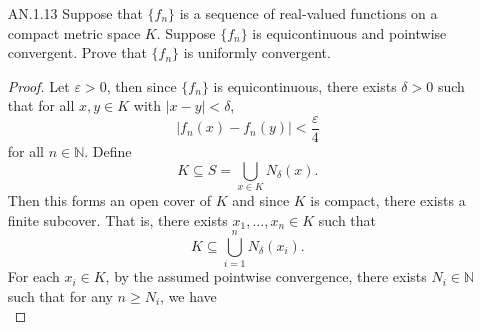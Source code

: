 \documentclass[12pt]{article}
\newenvironment{solution}
{\renewcommand\qedsymbol{$\blacksquare$}\begin{proof}[Solution]}
{\end{proof}}
\begin{document}
\begin{enumerate}
\begin{enumerate}[(a)]
\begin{solution}
                        order 7 in
                        $\mathbb{Z}_{49}\times\mathbb{Z}_{11}$.\par\hspace{4mm}
                        For
                        $\mathbb{Z}_7\times\mathbb{Z}_7\times\mathbb{Z}_{11}$,
                        we are looking for elements $(a, b, c)$ such that 
                        \begin{equation*}
                            lcm(o(a), o(b), o(c))=7.
                        \end{equation*}
                        Since $\mathbb{Z}_7\times\mathbb{Z}_7$ is a group of
                        order 49 and no element can have order 49, then there
                        are $49-1=48$ many elements order 7. 
                    \end{solution}
            \end{enumerate}
        \item[AN.1.13] Suppose that $\{f_n\}$ is a sequence of real-valued
            functions on a compact metric space $K$. Suppose $\{f_n\}$ is
            equicontinuous and pointwise convergent. Prove that $\{f_n\}$ is
            uniformly convergent. 
            \begin{proof}
                Let $\varepsilon>0$, then since $\{f_n\}$ is equicontinuous,
                there exists $\delta>0$ such that for all $x, y\in K$ with
                $|x-y|<\delta$, 
                \begin{equation*}
                    |f_n(x)-f_n(y)|<\frac{\varepsilon}{4}
                \end{equation*}
                for all $n\in\mathbb{N}$. Define 
                \begin{equation*}
                    K\subseteq S=\bigcup_{x\in K}N_{\delta}(x).
                \end{equation*}
                Then this forms an open cover of $K$ and since $K$ is compact,
                there exists a finite subcover. That is, there exists  $x_1,
                \dots, x_n\in K$ such that 
                \begin{equation*}
                    K\subseteq\bigcup_{i=1}^{n}N_{\delta}(x_i).
                \end{equation*}
                For each $x_i\in K$, by the assumed pointwise convergence,
                there exists $N_i\in\mathbb{N}$ such that for any $n\geq N_i$,
                we have 
                \begin{equation*}

\end{equation*}
\end{proof}
\end{enumerate}
\end{document}
